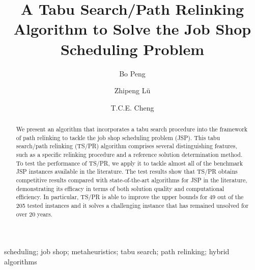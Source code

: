 \documentclass[authoryear,12pt]{elsarticle}
\begin{document}
\begin{frontmatter}



\title{A Tabu Search/Path Relinking Algorithm to Solve the Job Shop Scheduling Problem}

\author[HUST]{Bo Peng}

\author[HUST,PolyU]{Zhipeng L\"u}

\author[PolyU]{T.C.E. Cheng}


\address[HUST]{SMART, School of Computer Science and Technology, Huazhong University of Science and Technology, Wuhan, 430074, P.R. China}
\address[PolyU]{Department of Logistics and Maritime Studies, The Hong Kong Polytechnic University, Hung Hom, Kowloon, Hong Kong}

\begin{abstract}
We present an algorithm that incorporates a tabu search procedure into the framework of path relinking to tackle the job shop scheduling problem (JSP). This tabu search/path relinking (TS/PR) algorithm comprises several distinguishing features, such as a specific relinking procedure and a reference solution determination method. To test the performance of TS/PR, we apply it to tackle almost all of the benchmark JSP instances available in the literature. The test results show that TS/PR obtains competitive results compared with state-of-the-art algorithms for JSP in the literature, demonstrating its efficacy in terms of both solution quality and computational efficiency. In particular, TS/PR is able to improve the upper bounds for 49 out of the 205 tested instances and it solves a challenging instance that has remained unsolved for over 20 years.
\end{abstract}
\begin{keyword}
scheduling; job shop; metaheuristics; tabu search; path relinking; hybrid algorithms
\end{keyword}

\end{frontmatter}
\end{document}
